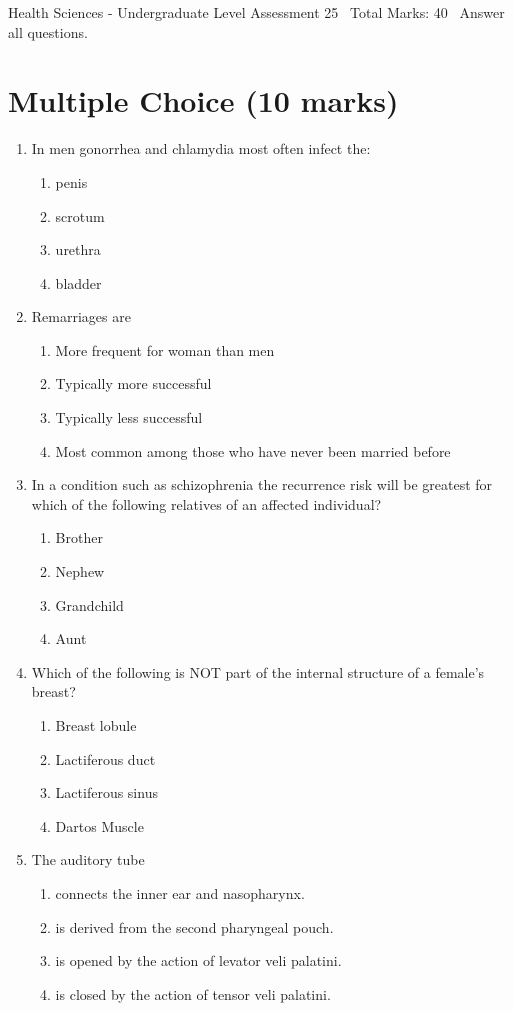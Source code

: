 \documentclass[12pt]{article}
\begin{document}
\begin{center}
Health Sciences - Undergraduate Level Assessment 25 \
Total Marks: 40 \
Answer all questions.
\end{center}

\section*{Multiple Choice (10 marks)}
\begin{enumerate}[label=\arabic*.]
\item In men gonorrhea and chlamydia most often infect the:
\begin{enumerate}[label=(\alph*)]
    \item penis
    \item scrotum
    \item urethra
    \item bladder
\end{enumerate}
\item Remarriages are
\begin{enumerate}[label=(\alph*)]
    \item More frequent for woman than men
    \item Typically more successful
    \item Typically less successful
    \item Most common among those who have never been married before
\end{enumerate}
\item In a condition such as schizophrenia the recurrence risk will be greatest for which of the following relatives of an affected individual?
\begin{enumerate}[label=(\alph*)]
    \item Brother
    \item Nephew
    \item Grandchild
    \item Aunt
\end{enumerate}
\item Which of the following is NOT part of the internal structure of a female's breast?
\begin{enumerate}[label=(\alph*)]
    \item Breast lobule
    \item Lactiferous duct
    \item Lactiferous sinus
    \item Dartos Muscle
\end{enumerate}
\item The auditory tube
\begin{enumerate}[label=(\alph*)]
    \item connects the inner ear and nasopharynx.
    \item is derived from the second pharyngeal pouch.
    \item is opened by the action of levator veli palatini.
    \item is closed by the action of tensor veli palatini.
\end{enumerate}
\end{enumerate}
\end{document}
